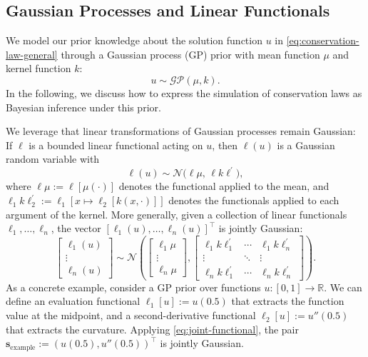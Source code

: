 \documentclass{article}
\theoremstyle{plain}
\theoremstyle{definition}
\theoremstyle{remark}
\newcommand{\R}{\mathbb{R}}
\newcommand{\GP}{\mathcal{GP}}
\newcommand{\Normal}{\mathcal{N}}
\begin{document}
\subsection{Gaussian Processes and Linear Functionals}
\label{sec:gp-background}

We model our prior knowledge about the solution function $u$ in \cref{eq:conservation-law-general} through a Gaussian process (GP) prior with mean function $\mu$ and kernel function $k$:
\begin{equation}
  u \sim \GP(\mu, k).
  \label{eq:gp-prior}
\end{equation}
In the following, we discuss how to express the simulation of conservation laws as Bayesian inference under this prior.

We leverage that linear transformations of Gaussian processes remain Gaussian:
If $\ell$ is a bounded linear functional acting on $u$, then $\ell(u)$ is a Gaussian random variable with
\begin{equation}
  \ell(u) \sim \Normal\bigl(\ell \mu, \, \ell k \ell^\prime \bigr),
  \label{eq:single-functional}
\end{equation}
where $\ell \mu := \ell[\mu(\cdot)]$ denotes the functional applied to the mean, and $\ell_1 k \ell_2^\prime := \ell_1[x \mapsto \ell_2[k(x, \cdot)]]$ denotes the functionals applied to each argument of the kernel.
More generally, given a collection of linear functionals $\ell_1, \ldots, \ell_n$, the vector $[\ell_1(u), \ldots, \ell_n(u)]^\top$ is jointly Gaussian:
\begin{equation}
  \begin{bmatrix} \ell_1(u) \\ \vdots \\ \ell_n(u) \end{bmatrix}
  \sim \Normal\left(
  \begin{bmatrix} \ell_1 \mu \\ \vdots \\ \ell_n \mu \end{bmatrix},
  \begin{bmatrix}
      \ell_1 k \ell_1^\prime & \cdots & \ell_1 k \ell_n^\prime \\
      \vdots                 & \ddots & \vdots                 \\
      \ell_n k \ell_1^\prime & \cdots & \ell_n k \ell_n^\prime
    \end{bmatrix}
  \right).
  \label{eq:joint-functional}
\end{equation}
As a concrete example, consider a GP prior over functions $u: [0, 1] \to \R$.
We can define an evaluation functional $\ell_1[u] := u(0.5)$ that extracts the function value at the midpoint, and a second-derivative functional $\ell_2[u] := u''(0.5)$ that extracts the curvature.
Applying \cref{eq:joint-functional}, the pair $\bm{s}_{\text{example}} := (u(0.5), u''(0.5))^\top$ is jointly Gaussian.
\end{document}
